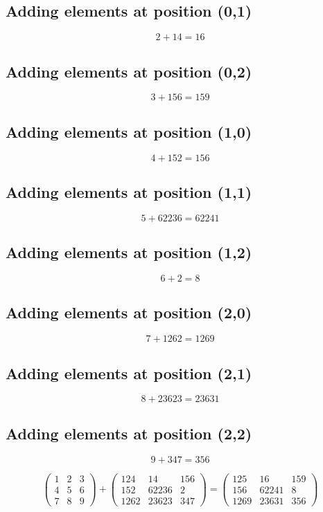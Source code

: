 \documentclass{article}
\begin{document}
\subsection*{ \vspace{1em} Adding elements at position (0,1)}
\[
2 + 14 = 16
\]
\subsection*{ \vspace{1em} Adding elements at position (0,2)}
\[
3 + 156 = 159
\]
\subsection*{ \vspace{1em} Adding elements at position (1,0)}
\[
4 + 152 = 156
\]
\subsection*{ \vspace{1em} Adding elements at position (1,1)}
\[
5 + 62236 = 62241
\]
\subsection*{ \vspace{1em} Adding elements at position (1,2)}
\[
6 + 2 = 8
\]
\subsection*{ \vspace{1em} Adding elements at position (2,0)}
\[
7 + 1262 = 1269
\]
\subsection*{ \vspace{1em} Adding elements at position (2,1)}
\[
8 + 23623 = 23631
\]
\subsection*{ \vspace{1em} Adding elements at position (2,2)}
\[
9 + 347 = 356
\]
\medskip

\[
\begin{pmatrix}1 & 2 & 3 \\ 4 & 5 & 6 \\ 7 & 8 & 9\end{pmatrix} + \begin{pmatrix}124 & 14 & 156 \\ 152 & 62236 & 2 \\ 1262 & 23623 & 347\end{pmatrix} = \begin{pmatrix}125 & 16 & 159 \\ 156 & 62241 & 8 \\ 1269 & 23631 & 356\end{pmatrix}
\]
\bigskip
\end{document}
